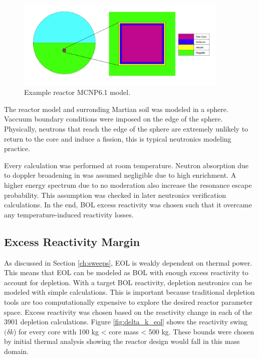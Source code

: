 \begin{figure}[h]
    \centering
    \includegraphics[width=4in]{../images/crit_model_geom.png}
\caption{Example reactor MCNP6.1 model.}
\label{fig:homog_model}
\end{figure}

The reactor model and surronding Martian soil was modeled in a sphere. Vaccuum
boundary conditions were imposed on the edge of the sphere. Physically, neutrons
that reach the edge of the sphere are extremely unlikely to return to the core
and induce a fission, this is typical neutronics modeling practice.

Every \keff calculation was performed at room temperature. Neutron absorption
due to doppler broadening in 
\urantwo was assumed negligible due to high enrichment. A higher energy
spectrum due to no moderation also increase the resonance escape probability.
This assumption was checked in later neutronics verification calculations. 
In the end, BOL excess reactivity was chosen such that it overcame any 
temperature-induced reactivity losses. 

\subsection{Excess Reactivity Margin}
As discussed in Section \ref{ch:sweeps}, EOL \keff is weakly dependent on
thermal power. This means that EOL \keff can be modeled as BOL \keff with enough
excess reactivity to account for depletion. With a target BOL reactivity,
depletion neutronics can be modeled with simple \keff calculations. This
is important because traditional depletion tools are too computationally
expensive to explore the desired reactor parameter space. Excess reactivity was
chosen based on the reactivity change in each of the 3901 depletion calculations. Figure
\ref{fig:delta_k_eol} shows the reactivity swing $(\delta k$) for every core
with 100 kg < core mass < 500 kg. These bounds were chosen by initial thermal analysis
showing the reactor design would fall in this mass domain.

